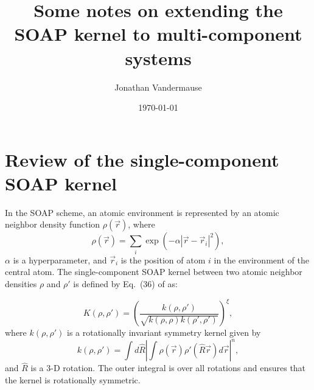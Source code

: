 \documentclass[%
preprint,
amsmath,amssymb,
aps,
]{revtex4-1}
\begin{document}
\title{Some notes on extending the SOAP kernel to multi-component systems}

\author{Jonathan Vandermause}

\date{\today}


\maketitle

\section{Review of the single-component SOAP kernel}

In the SOAP scheme, an atomic environment is represented by an atomic neighbor density function $\rho(\vec{r})$, where
\begin{equation}
\rho(\vec{r}) = \sum_i \exp\left(-\alpha | \vec{r} - \vec{r}_i|^2 \right),
\end{equation}
$\alpha$ is a hyperparameter, and $\vec{r}_i$ is the position of atom $i$ in the environment of the central atom. The single-component SOAP kernel between two atomic neighbor densities $\rho$ and $\rho'$ is defined by Eq.\ (36) of \cite{bartok2013representing} as:

\begin{equation}
    K(\rho, \rho') = \left(\frac{k (\rho, \rho')}{\sqrt{k(\rho, \rho) k(\rho', \rho')}} \right) ^{\xi},
\end{equation}
where $k(\rho, \rho')$ is a rotationally invariant symmetry kernel given by
\begin{equation}
k(\rho, \rho') = \int d\hat{R} \left| \int \rho(\vec{r}) \rho'(\hat{R}\vec{r}) d\vec{r} \right| ^n,
\end{equation}
and $\hat{R}$ is a 3-D rotation. The outer integral is over all rotations and ensures that the kernel is rotationally symmetric.
\end{document}
